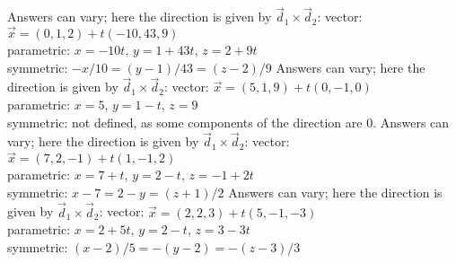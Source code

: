 \begin{Answer}
\Question Answers can vary; here the direction is given by $\vec d_1\times \vec d_2$:
vector: $\vec x = (0,1,2) + t(-10,43,9)$\\
parametric: $x= -10t$, $y=1+43t$, $z = 2+9t$\\
symmetric: $-x/10 =(y-1)/43 = (z-2)/9$
\Question Answers can vary; here the direction is given by $\vec d_1\times \vec d_2$:
vector: $\vec x = (5,1,9) + t(0,-1,0)$\\
parametric: $x= 5$, $y=1-t$, $z = 9$\\
symmetric: not defined, as some components of the direction are 0.
\Question Answers can vary; here the direction is given by $\vec d_1\times \vec d_2$:
vector: $\vec x = (7,2,-1) + t(1,-1,2)$\\
parametric: $x= 7+t$, $y=2-t$, $z = -1+2t$\\
symmetric: $x-7=2-y=(z+1)/2$
\Question Answers can vary; here the direction is given by $\vec d_1\times \vec d_2$:
vector: $\vec x = (2,2,3) + t(5,-1,-3)$\\
parametric: $x= 2+5t$, $y=2-t$, $z = 3-3t$\\
symmetric: $(x-2)/5=-(y-2)=-(z-3)/3$

\end{Answer}
